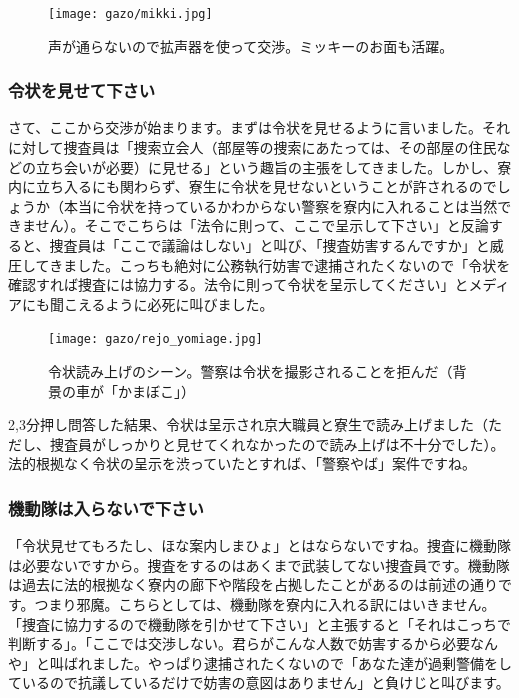 \begin{figure}
  \centering
  \texttt{[image: gazo/mikki.jpg]}
  \caption*{{\small 声が通らないので拡声器を使って交渉。ミッキーのお面も活躍。}}
\end{figure}

\subsubsection{令状を見せて下さい}




さて、ここから交渉が始まります。まずは令状を見せるように言いました。それに対して捜査員は「捜索立会人（部屋等の捜索にあたっては、その部屋の住民などの立ち会いが必要）に見せる」という趣旨の主張をしてきました。しかし、寮内に立ち入るにも関わらず、寮生に令状を見せないということが許されるのでしょうか（本当に令状を持っているかわからない警察を寮内に入れることは当然できません）。そこでこちらは「法令に則って、ここで呈示して下さい」と反論すると、捜査員は「ここで議論はしない」と叫び、「捜査妨害するんですか」と威圧してきました。こっちも絶対に公務執行妨害で逮捕されたくないので「令状を確認すれば捜査には協力する。法令に則って令状を呈示してください」とメディアにも聞こえるように必死に叫びました。

\begin{figure}
  \centering
  \texttt{[image: gazo/rejo\_yomiage.jpg]}
  \caption*{{\small 令状読み上げのシーン。警察は令状を撮影されることを拒んだ（背景の車が「かまぼこ」）}}
\end{figure}


2,3分押し問答した結果、令状は呈示され京大職員と寮生で読み上げました（ただし、捜査員がしっかりと見せてくれなかったので読み上げは不十分でした）。法的根拠なく令状の呈示を渋っていたとすれば、「警察やば」案件ですね。




\subsubsection{機動隊は入らないで下さい}

「令状見せてもろたし、ほな案内しまひょ」とはならないですね。捜査に機動隊は必要ないですから。捜査をするのはあくまで武装してない捜査員です。機動隊は過去に法的根拠なく寮内の廊下や階段を占拠したことがあるのは前述の通りです。つまり邪魔。こちらとしては、機動隊を寮内に入れる訳にはいきません。「捜査に協力するので機動隊を引かせて下さい」と主張すると「それはこっちで判断する」。「ここでは交渉しない。君らがこんな人数で妨害するから必要なんや」と叫ばれました。やっぱり逮捕されたくないので「あなた達が過剰警備をしているので抗議しているだけで妨害の意図はありません」と負けじと叫びます。

